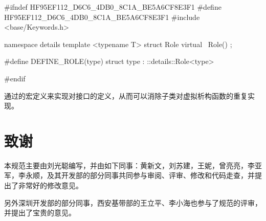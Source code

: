 \begin{content}
\begin{leftbar}
\begin{c++}[caption={base/Role.h}]
#ifndef HF95EF112_D6C6_4DB0_8C1A_BE5A6CF8E3F1
#define HF95EF112_D6C6_4DB0_8C1A_BE5A6CF8E3F1
#include <base/Keywords.h>

namespace details
{
   template <typename T>
   struct Role
   {
      virtual ~Role() {}
   };
}

#define DEFINE_ROLE(type) struct type : ::details::Role<type>

#endif
\end{c++}
\end{leftbar}

通过的宏定义来实现对接口的定义，从而可以消除子类对虚拟析构函数的重复实现。

\end{content}

\section*{致谢}

\begin{content}

本规范主要由刘光聪编写，并由如下同事：黄新文，刘苏建，王妮，曾亮亮，李亚军，李永顺，及其开发部的部分同事共同参与审阅、评审、修改和代码走查，并提出了非常好的修改意见。

另外深圳开发部的部分同事，西安基带部的王立平、李小海也参与了规范的评审，并提出了宝贵的意见。

\end{content}